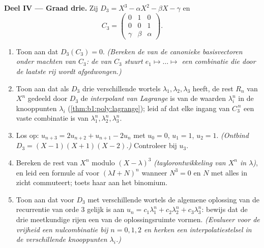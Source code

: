 \begin{problem}
\medskip
\noindent\textbf{Deel IV --- Graad drie.} Zij $D_3 = X^3 - \alpha
X^2 - \beta X - \gamma$ en
\[
C_3 = \begin{pmatrix} 0 & 1 & 0\\ 0 & 0 & 1\\ \gamma & \beta &
\alpha \end{pmatrix}.
\]
\begin{enumerate}[resume]
  \item Toon aan dat $D_3(C_3) = 0$. \emph{(Bereken de  van
        de canonieke basisvectoren onder machten van $C_3$: de
         van $C_3$ stuurt $e_1 \mapsto \dots \mapsto$ een
        combinatie die door de laatste rij wordt afgedwongen.)}
  \item Toon aan dat als $D_3$ drie verschillende wortels
        $\lambda_1, \lambda_2, \lambda_3$ heeft, de rest $R_n$ van
        $X^n$ gedeeld door $D_3$ de \emph{interpolant van Lagrange}
        is van de waarden $\lambda_i^n$ in de knooppunten
        $\lambda_i$ (\cref{thm:b1:poly:lagrange}); leid af dat elke
        ingang van $C_3^{\,n}$ een vaste  combinatie is van
        $\lambda_1^n, \lambda_2^n, \lambda_3^n$.
  \item Los op: $u_{n+3} = 2u_{n+2} + u_{n+1} - 2u_n$ met $u_0 =
        0$, $u_1 = 1$, $u_2 = 1$. \emph{(Ontbind $D_3 = (X - 1)(X +
        1)(X - 2)$.)} Controleer bij $u_3$.
  \item Bereken de rest van $X^n$ modulo $(X - \lambda)^3$
        \emph{(taylorontwikkeling van $X^n$ in $\lambda$)}, en leid
        een formule af voor $(\lambda I + N)^n$ wanneer $N^3 = 0$
        en $N$ met alles in zicht commuteert; toets haar aan het
        binomium.
  \item Toon aan dat voor $D_3$ met verschillende wortels de
        algemene oplossing van de recurrentie van orde $3$ gelijk
        is aan $u_n = c_1 \lambda_1^n + c_2\lambda_2^n +
        c_3\lambda_3^n$: bewijs dat de drie meetkundige rijen een
         van de oplossingsruimte vormen. \emph{(Evalueer voor
        de vrijheid een nulcombinatie bij $n = 0, 1, 2$ en herken
        een interpolatiestelsel in de verschillende knooppunten
        $\lambda_i$.)}
\end{enumerate}


\end{problem}
